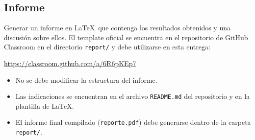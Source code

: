 \newpage
\subsection{Informe} \label{subsec:report}

Generar un informe en \LaTeX\ que contenga los resultados obtenidos y una discusión sobre ellos.  
El template oficial se encuentra en el repositorio de GitHub Classroom en el directorio \texttt{report/} y debe utilizarse en esta entrega:

\begin{mdframed}
\begin{center}
    \url{https://classroom.github.com/a/6R6pKEp7}
\end{center}
\end{mdframed}

\begin{itemize}
    \item No se debe modificar la estructura del informe.
    \item Las indicaciones se encuentran en el archivo \texttt{README.md} del repositorio y en la plantilla de \LaTeX.
    \item El informe final compilado (\texttt{reporte.pdf}) debe generarse dentro de la carpeta \texttt{report/}.
\end{itemize}

